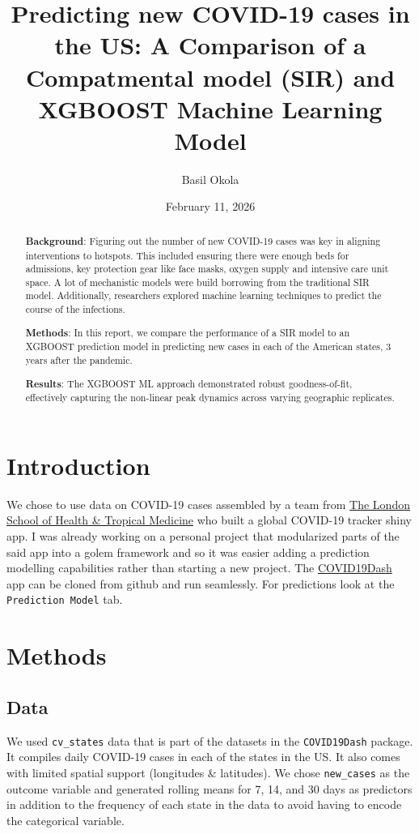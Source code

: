 \documentclass[
  letterpaper,
  DIV=11,
  numbers=noendperiod]{scrartcl}
\title{Predicting new COVID-19 cases in the US: A Comparison of a
Compatmental model (SIR) and XGBOOST Machine Learning Model}
\author{Basil Okola}
\date{February 11, 2026}
\begin{document}
\maketitle
\begin{abstract}
\textbf{Background}: Figuring out the number of new COVID-19 cases was
key in aligning interventions to hotspots. This included ensuring there
were enough beds for admissions, key protection gear like face masks,
oxygen supply and intensive care unit space. A lot of mechanistic models
were build borrowing from the traditional SIR model. Additionally,
researchers explored machine learning techniques to predict the course
of the infections.

\textbf{Methods}: In this report, we compare the performance of a SIR
model to an XGBOOST prediction model in predicting new cases in each of
the American states, 3 years after the pandemic.

\textbf{Results}: The XGBOOST ML approach demonstrated robust
goodness-of-fit, effectively capturing the non-linear peak dynamics
across varying geographic replicates.
\end{abstract}


\section{Introduction}\label{introduction}

We chose to use data on COVID-19 cases assembled by a team from
\href{https://vac-lshtm.shinyapps.io/ncov_tracker/\#}{The London School
of Health \& Tropical Medicine} who built a global COVID-19 tracker
shiny app. I was already working on a personal project that modularized
parts of the said app into a golem framework and so it was easier adding
a prediction modelling capabilities rather than starting a new project.
The \href{https://github.com/Bokola/COVID19Dash}{COVID19Dash} app can be
cloned from github and run seamlessly. For predictions look at the
\texttt{Prediction\ Model} tab.

\section{Methods}\label{methods}

\subsection{Data}\label{data}

We used \texttt{cv\_states} data that is part of the datasets in the
\texttt{COVID19Dash} package. It compiles daily COVID-19 cases in each
of the states in the US. It also comes with limited spatial support
(longitudes \& latitudes). We chose \texttt{new\_cases} as the outcome
variable and generated rolling means for 7, 14, and 30 days as
predictors in addition to the frequency of each state in the data to
avoid having to encode the categorical variable.
\end{document}
